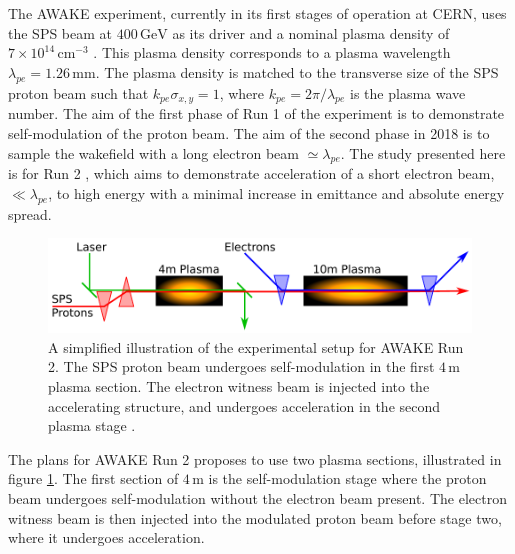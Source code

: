 \documentclass[aps,prstab,reprint,amsmath,amssymb,groupedaddress]{revtex4-1}
\newcommand{\unit}[1]{\,\mathrm{#1}}
\newcommand{\nexp}[1]{\times 10^{#1}}
\begin{document}
The AWAKE experiment, currently in its first stages of operation at CERN, uses the SPS beam at $400\unit{GeV}$ as its
driver and a nominal plasma density of $7\nexp{14}\unit{cm}^{-3}$ \cite{gschwendtner:2016}. This plasma density
corresponds to a plasma wavelength $\lambda_{pe} = 1.26\unit{mm}$. The plasma density is matched to the transverse size
of the SPS proton beam such that $k_{pe}\sigma_{x,y} = 1$, where $k_{pe} = 2\pi/\lambda_{pe}$ is the plasma wave number.
The aim of the first phase of Run 1 of the experiment is to demonstrate self-modulation of the proton beam. The aim of
the second phase in 2018 is to sample the wakefield with a long electron beam $\simeq\lambda_{pe}$. The study presented
here is for Run 2 \cite{adli:2016}, which aims to demonstrate acceleration of a short electron beam, $\ll\lambda_{pe}$,
to high energy with a minimal increase in emittance and absolute energy spread.

\begin{figure}[hbt]
    \includegraphics[width=0.99\linewidth,trim={1mm 2mm 1mm 2mm},clip]{figures/figAWAKE}
    \caption{\label{Fig:AWAKER2} A simplified illustration of the experimental setup for AWAKE Run 2. The SPS proton
        beam undergoes self-modulation in the first $4\unit{m}$ plasma section. The electron witness beam is injected
        into the accelerating structure, and undergoes acceleration in the second plasma stage
        \cite{berglyd_olsen:2015, adli:2016}.}
\end{figure}

The plans for AWAKE Run 2 proposes to use two plasma sections, illustrated in figure \ref{Fig:AWAKER2}. The first
section of $4\unit{m}$ is the self-modulation stage where the proton beam undergoes self-modulation without the electron
beam present. The electron witness beam is then  injected into the modulated proton beam before stage two, where it
undergoes acceleration.
\end{document}
